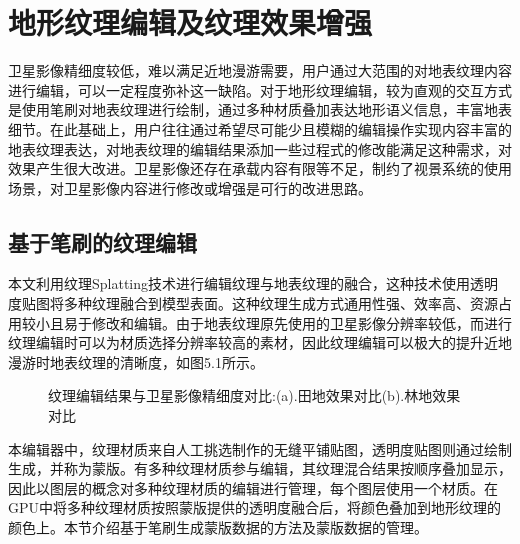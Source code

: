 \chapter{地形纹理编辑及纹理效果增强}
卫星影像精细度较低，难以满足近地漫游需要，用户通过大范围的对地表纹理内容进行编辑，可以一定程度弥补这一缺陷。对于地形纹理编辑，较为直观的交互方式是使用笔刷对地表纹理进行绘制，通过多种材质叠加表达地形语义信息，丰富地表细节。在此基础上，用户往往通过希望尽可能少且模糊的编辑操作实现内容丰富的地表纹理表达，对地表纹理的编辑结果添加一些过程式的修改能满足这种需求，对效果产生很大改进。卫星影像还存在承载内容有限等不足，制约了视景系统的使用场景，对卫星影像内容进行修改或增强是可行的改进思路。

\section{基于笔刷的纹理编辑}
本文利用纹理Splatting技术\supercite{splatting}进行编辑纹理与地表纹理的融合，这种技术使用透明度贴图将多种纹理融合到模型表面。这种纹理生成方式通用性强、效率高、资源占用较小且易于修改和编辑。由于地表纹理原先使用的卫星影像分辨率较低，而进行纹理编辑时可以为材质选择分辨率较高的素材，因此纹理编辑可以极大的提升近地漫游时地表纹理的清晰度，如图5.1所示。
\begin{figure}[htbp]
\centering
{}
\caption{纹理编辑结果与卫星影像精细度对比:(a).田地效果对比(b).林地效果对比}
\end{figure}
本编辑器中，纹理材质来自人工挑选制作的无缝平铺贴图，透明度贴图则通过绘制生成，并称为蒙版。有多种纹理材质参与编辑，其纹理混合结果按顺序叠加显示，因此以图层的概念对多种纹理材质的编辑进行管理，每个图层使用一个材质。在GPU中将多种纹理材质按照蒙版提供的透明度融合后，将颜色叠加到地形纹理的颜色上。本节介绍基于笔刷生成蒙版数据的方法及蒙版数据的管理。


